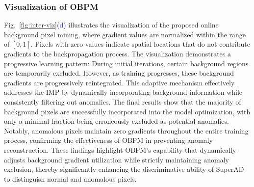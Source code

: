 \subsubsection{Visualization of OBPM}
Fig.~\ref{fig:inter-viz}\textcolor{blue}{(d)} illustrates the visualization of the proposed online background pixel mining, where gradient values are normalized within the range of $[0,1]$. Pixels with zero values indicate spatial locations that do not contribute gradients to the backpropagation process. The visualization demonstrates a progressive learning pattern: During initial iterations, certain background regions are temporarily excluded. However, as training progresses, these background gradients are progressively reintegrated. This adaptive mechanism effectively addresses the IMP by dynamically incorporating background information while consistently filtering out anomalies. The final results show that the majority of background pixels are successfully incorporated into the model optimization, with only a minimal fraction being erroneously excluded as potential anomalies. Notably, anomalous pixels maintain zero gradients throughout the entire training process, confirming the effectiveness of OBPM in preventing anomaly reconstruction. These findings highlight OBPM's capability that dynamically adjusts background gradient utilization while strictly maintaining anomaly exclusion, thereby significantly enhancing the discriminative ability of SuperAD to distinguish normal and anomalous pixels.






























